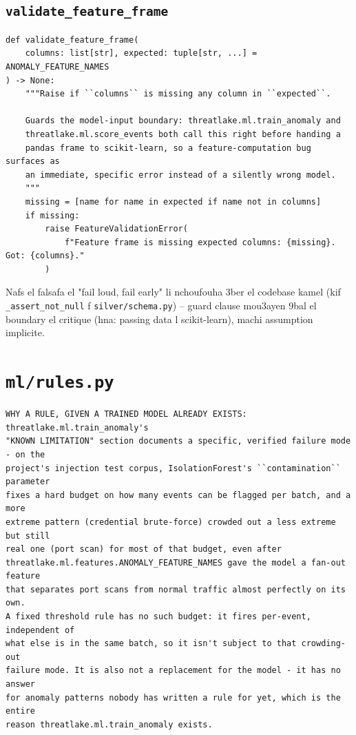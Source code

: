 \documentclass[11pt,a4paper]{report}
\DeclareRobustCommand{\code}[1]{\texttt{#1}}
\DeclareRobustCommand{\file}[1]{\texttt{\color{amber}#1}}
\begin{document}
\subsection{\code{validate\_feature\_frame}}

\begin{lstlisting}[style=pystyle]
def validate_feature_frame(
    columns: list[str], expected: tuple[str, ...] = ANOMALY_FEATURE_NAMES
) -> None:
    """Raise if ``columns`` is missing any column in ``expected``.

    Guards the model-input boundary: threatlake.ml.train_anomaly and
    threatlake.ml.score_events both call this right before handing a
    pandas frame to scikit-learn, so a feature-computation bug surfaces as
    an immediate, specific error instead of a silently wrong model.
    """
    missing = [name for name in expected if name not in columns]
    if missing:
        raise FeatureValidationError(
            f"Feature frame is missing expected columns: {missing}. Got: {columns}."
        )
\end{lstlisting}

Nafs el falsafa el "fail loud, fail early" li nchoufouha 3ber el codebase
kamel (kif \code{\_assert\_not\_null} f \code{silver/schema.py}) -- guard
clause mou3ayen 9bal el boundary el critique (hna: passing data l
scikit-learn), machi assumption implicite.

\section{\file{ml/rules.py}}

\begin{lstlisting}[style=pystyle]
WHY A RULE, GIVEN A TRAINED MODEL ALREADY EXISTS: threatlake.ml.train_anomaly's
"KNOWN LIMITATION" section documents a specific, verified failure mode - on the
project's injection test corpus, IsolationForest's ``contamination`` parameter
fixes a hard budget on how many events can be flagged per batch, and a more
extreme pattern (credential brute-force) crowded out a less extreme but still
real one (port scan) for most of that budget, even after
threatlake.ml.features.ANOMALY_FEATURE_NAMES gave the model a fan-out feature
that separates port scans from normal traffic almost perfectly on its own.
A fixed threshold rule has no such budget: it fires per-event, independent of
what else is in the same batch, so it isn't subject to that crowding-out
failure mode. It is also not a replacement for the model - it has no answer
for anomaly patterns nobody has written a rule for yet, which is the entire
reason threatlake.ml.train_anomaly exists.
\end{lstlisting}
\end{document}
